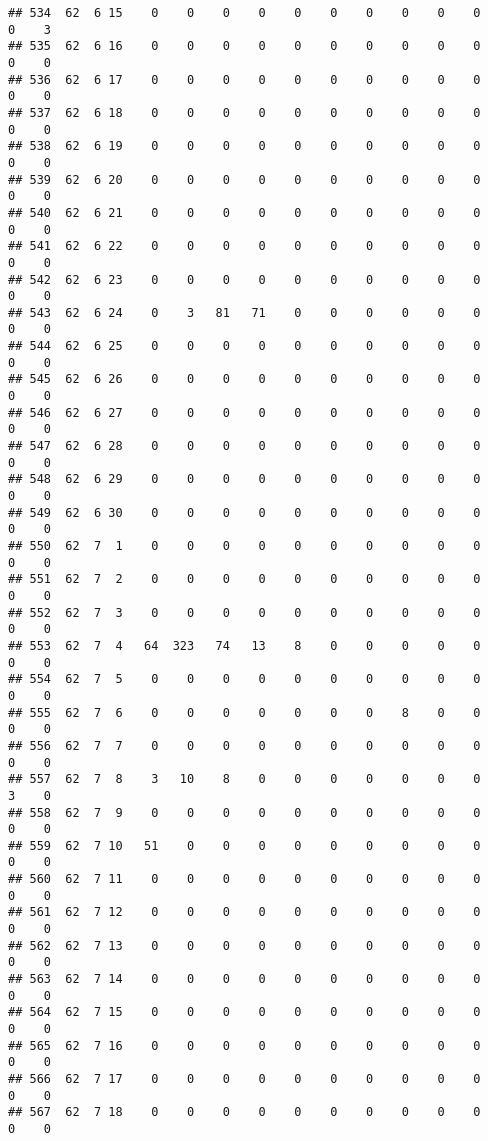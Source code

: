 \documentclass[]{article}
\begin{document}
\begin{verbatim}
## 534  62  6 15    0    0    0    0    0    0    0    0    0    0    0    3
## 535  62  6 16    0    0    0    0    0    0    0    0    0    0    0    0
## 536  62  6 17    0    0    0    0    0    0    0    0    0    0    0    0
## 537  62  6 18    0    0    0    0    0    0    0    0    0    0    0    0
## 538  62  6 19    0    0    0    0    0    0    0    0    0    0    0    0
## 539  62  6 20    0    0    0    0    0    0    0    0    0    0    0    0
## 540  62  6 21    0    0    0    0    0    0    0    0    0    0    0    0
## 541  62  6 22    0    0    0    0    0    0    0    0    0    0    0    0
## 542  62  6 23    0    0    0    0    0    0    0    0    0    0    0    0
## 543  62  6 24    0    3   81   71    0    0    0    0    0    0    0    0
## 544  62  6 25    0    0    0    0    0    0    0    0    0    0    0    0
## 545  62  6 26    0    0    0    0    0    0    0    0    0    0    0    0
## 546  62  6 27    0    0    0    0    0    0    0    0    0    0    0    0
## 547  62  6 28    0    0    0    0    0    0    0    0    0    0    0    0
## 548  62  6 29    0    0    0    0    0    0    0    0    0    0    0    0
## 549  62  6 30    0    0    0    0    0    0    0    0    0    0    0    0
## 550  62  7  1    0    0    0    0    0    0    0    0    0    0    0    0
## 551  62  7  2    0    0    0    0    0    0    0    0    0    0    0    0
## 552  62  7  3    0    0    0    0    0    0    0    0    0    0    0    0
## 553  62  7  4   64  323   74   13    8    0    0    0    0    0    0    0
## 554  62  7  5    0    0    0    0    0    0    0    0    0    0    0    0
## 555  62  7  6    0    0    0    0    0    0    0    8    0    0    0    0
## 556  62  7  7    0    0    0    0    0    0    0    0    0    0    0    0
## 557  62  7  8    3   10    8    0    0    0    0    0    0    0    3    0
## 558  62  7  9    0    0    0    0    0    0    0    0    0    0    0    0
## 559  62  7 10   51    0    0    0    0    0    0    0    0    0    0    0
## 560  62  7 11    0    0    0    0    0    0    0    0    0    0    0    0
## 561  62  7 12    0    0    0    0    0    0    0    0    0    0    0    0
## 562  62  7 13    0    0    0    0    0    0    0    0    0    0    0    0
## 563  62  7 14    0    0    0    0    0    0    0    0    0    0    0    0
## 564  62  7 15    0    0    0    0    0    0    0    0    0    0    0    0
## 565  62  7 16    0    0    0    0    0    0    0    0    0    0    0    0
## 566  62  7 17    0    0    0    0    0    0    0    0    0    0    0    0
## 567  62  7 18    0    0    0    0    0    0    0    0    0    0    0    0

\end{verbatim}
\end{document}
